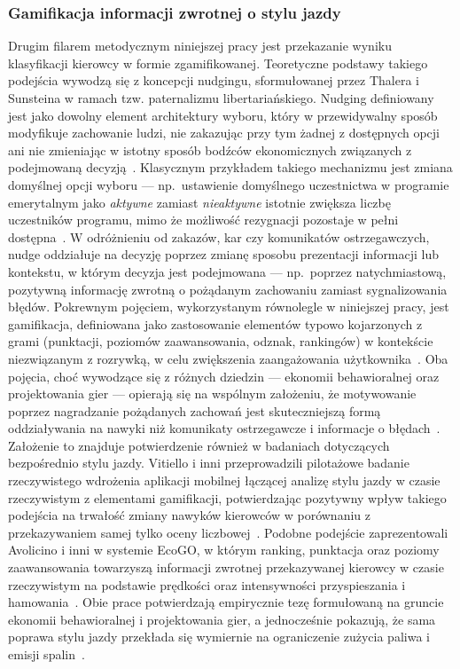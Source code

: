 \subsubsection{Gamifikacja informacji zwrotnej o stylu jazdy}

Drugim filarem metodycznym niniejszej pracy jest przekazanie wyniku klasyfikacji
kierowcy w formie zgamifikowanej. Teoretyczne podstawy takiego podejścia wywodzą się
z koncepcji nudgingu, sformułowanej przez Thalera i Sunsteina w ramach tzw.
paternalizmu libertariańskiego. Nudging definiowany jest jako dowolny element
architektury wyboru, który w przewidywalny sposób modyfikuje zachowanie ludzi, nie
zakazując przy tym żadnej z dostępnych opcji ani nie zmieniając w istotny sposób
bodźców ekonomicznych związanych z podejmowaną decyzją~\cite{thaler2008}. Klasycznym
przykładem takiego mechanizmu jest zmiana domyślnej opcji wyboru --- np.\ ustawienie
domyślnego uczestnictwa w programie emerytalnym jako \emph{aktywne} zamiast
\emph{nieaktywne} istotnie zwiększa liczbę uczestników programu, mimo że możliwość
rezygnacji pozostaje w pełni dostępna~\cite{thaler2008}. W odróżnieniu
od zakazów, kar czy komunikatów ostrzegawczych, nudge oddziałuje na decyzję poprzez
zmianę sposobu prezentacji informacji lub kontekstu, w którym decyzja jest
podejmowana --- np.\ poprzez natychmiastową, pozytywną informację zwrotną o pożądanym
zachowaniu zamiast sygnalizowania błędów. Pokrewnym pojęciem, wykorzystanym
równolegle w niniejszej pracy, jest gamifikacja, definiowana jako zastosowanie
elementów typowo kojarzonych z grami (punktacji, poziomów zaawansowania, odznak,
rankingów) w kontekście niezwiązanym z rozrywką, w celu zwiększenia zaangażowania
użytkownika~\cite{deterding2011}. Oba pojęcia, choć wywodzące się z różnych
dziedzin --- ekonomii behawioralnej oraz projektowania gier --- opierają się na
wspólnym założeniu, że motywowanie poprzez nagradzanie pożądanych zachowań jest
skuteczniejszą formą oddziaływania na nawyki niż komunikaty ostrzegawcze i informacje
o błędach~\cite{thaler2008,deterding2011}. Założenie to znajduje potwierdzenie również
w badaniach dotyczących bezpośrednio stylu jazdy. Vitiello i inni przeprowadzili
pilotażowe badanie rzeczywistego wdrożenia aplikacji mobilnej łączącej analizę stylu
jazdy w czasie rzeczywistym z elementami gamifikacji, potwierdzając pozytywny wpływ
takiego podejścia na trwałość zmiany nawyków kierowców w porównaniu z przekazywaniem
samej tylko oceny liczbowej~\cite{vitiello2023}. Podobne podejście zaprezentowali
Avolicino i inni w systemie EcoGO, w którym ranking, punktacja oraz poziomy
zaawansowania towarzyszą informacji zwrotnej przekazywanej kierowcy w czasie
rzeczywistym na podstawie prędkości oraz intensywności przyspieszania
i hamowania~\cite{avolicino2022}. Obie prace potwierdzają empirycznie tezę formułowaną
na gruncie ekonomii behawioralnej i projektowania gier, a jednocześnie pokazują, że
sama poprawa stylu jazdy przekłada się wymiernie na ograniczenie zużycia paliwa
i emisji spalin~\cite{barkenbus2010}.

